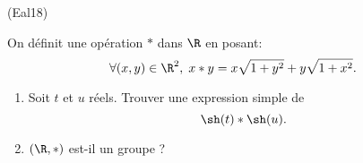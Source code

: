 \begin{tiny}(Eal18)\end{tiny} On définit une opération $*$ dans $\R$ en posant:
\begin{displaymath}
 \forall (x,y)\in \R^2,\; x*y = x\sqrt{1+y^2} + y\sqrt{1+x^2}.
\end{displaymath}
\begin{enumerate}
 \item Soit $t$ et $u$ réels. Trouver une expression simple de
\begin{displaymath}
 \sh(t) * \sh(u).
\end{displaymath}
\item $(\R, *)$ est-il un groupe ? 
\end{enumerate}
